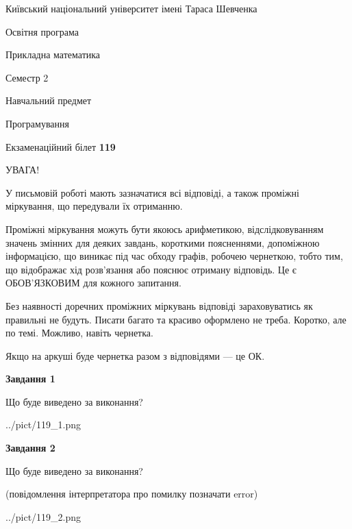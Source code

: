\documentclass[12pt, ukrainian]{article}
\begin{document}
{{\begin {small}\par
{ \center  Київський національний університет імені Тараса Шевченка \par}
{\parbox {5 cm}{Освітня програма \hfill}{\parbox {7 cm}{Прикладна математика\hfill}}\parbox {6 cm}{\hfill Семестр 2}}\par
{\parbox {5 cm} {Навчальний предмет \hfill}\parbox {7 cm}{Програмування \hfill}\parbox {6cm}{\hfill}\par}\vspace{-7pt} \end{small}}{\center Екзаменаційний білет \No \textbf
{ 119 }\par}}
{
\begin {large}
УВАГА!

У письмовій роботі мають зазначатися всі відповіді, а також проміжні міркування, що передували їх отриманню.

Проміжні міркування можуть бути якоюсь арифметикою, відслідковуванням зна\-чень змінних для деяких завдань,
короткими поясненнями, допоміжною інформацією, що виникає під час обходу графів, робочею чернеткою,
тобто тим, що відображає хід розв’язання або пояснює отриману відповідь.
Це є ОБОВ’ЯЗКОВИМ для кожного запитання.

Без наявності доречних проміжних міркувань відповіді зараховуватись як правиль\-ні не будуть.
Писати багато та красиво оформлено не треба. Коротко, але по темі. Можли\-во, навіть чернетка.

Якщо на аркуші буде чернетка разом з відповідями --- це ОК.

\newpage

{\begin {center}\textbf{Завдання 1}\end {center}}\par
Що буде виведено за виконання?\par
\begin{center}
	{../pict/119_1.png}
\end{center}
\newpage

{\begin {center}\textbf{Завдання 2}\end {center}}\par
Що буде виведено за виконання?\par
 (повідомлення інтерпретатора про помилку позначати error)\par
\begin{center}
	{../pict/119_2.png}
\end{center}
\newpage


\end{large}}
\end{document}
